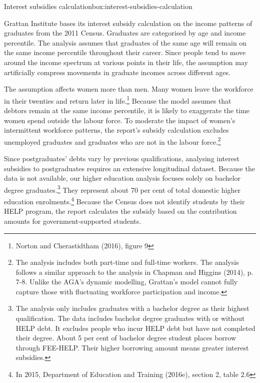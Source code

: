 \documentclass[embargoed]{grattan}
\begin{document}
\begin{smallbox}{Interest subsidies calculation}{box:interest-subsidies-calculation}

Grattan Institute bases its interest subsidy calculation on the income patterns of graduates from the 2011 Census. Graduates are categorised by age and income percentile. The analysis assumes that graduates of the same age will remain on the same income percentile throughout their career. Since people tend to move around the income spectrum at various points in their life, the assumption may artificially compress movements in graduate incomes across different ages.

The assumption affects women more than men. Many women leave the workforce in their twenties and return later in life.\footnote{Norton and Cherastidtham (2016), figure 9} Because the model assumes that debtors remain at the same income percentile, it is likely to exaggerate the time women spend outside the labour force. To moderate the impact of women's intermittent workforce patterns, the report's subsidy calculation excludes unemployed graduates and graduates who are not in the labour force.\footnote{The analysis includes both part-time and full-time workers. The analysis follows a similar approach to the analysis in Chapman and Higgins (2014), p. 7-8. Unlike the AGA's dynamic modelling, Grattan's model cannot fully capture those with fluctuating workforce participation and income.}

Since postgraduates' debts vary by previous qualifications, analysing interest subsidies to postgraduates requires an extensive longitudinal dataset. Because the data is not available, our higher education analysis focuses solely on bachelor degree graduates.\footnote{The analysis only includes graduates with a bachelor degree as their highest qualification. The data includes bachelor degree graduates with or without HELP debt. It excludes people who incur HELP debt but have not completed their degree. About 5 per cent of bachelor degree student places borrow through FEE-HELP. Their higher borrowing amount means greater interest subsidies.} They represent about 70 per cent of total domestic higher education enrolments.\footnote{In 2015, Department of Education and Training (2016e), section 2, table 2.6} Because the Census does not identify students by their HELP program, the report calculates the subsidy based on the contribution amounts for government-supported students.
\end{smallbox}
\end{document}
